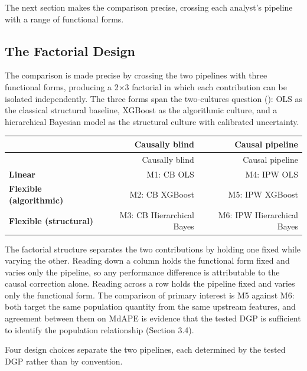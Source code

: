 The next section makes the comparison precise, crossing each analyst's pipeline with a range of functional forms.

\subsection{The Factorial Design}

The comparison is made precise by crossing the two pipelines with three functional forms, producing a 2$\times$3 factorial in which each contribution can be isolated independently. The three forms span the two-cultures question (): OLS as the classical structural baseline, XGBoost as the algorithmic culture, and a hierarchical Bayesian model as the structural culture with calibrated uncertainty.

{
\footnotesize
\setlength{\tabcolsep}{5pt}
\renewcommand{\arraystretch}{1.15}
\begin{longtable}{lrr}
\toprule
 & Causally blind & Causal pipeline \\
\midrule
\endfirsthead
\toprule
 & Causally blind & Causal pipeline \\
\midrule
\endhead
\bottomrule
\endlastfoot
\textbf{Linear} & M1: CB OLS & M4: IPW OLS \\
\textbf{Flexible (algorithmic)} & M2: CB XGBoost & M5: IPW XGBoost \\
\textbf{Flexible (structural)} & M3: CB Hierarchical Bayes & M6: IPW Hierarchical Bayes \\
\end{longtable}
}

The factorial structure separates the two contributions by holding one fixed while varying the other. Reading down a column holds the functional form fixed and varies only the pipeline, so any performance difference is attributable to the causal correction alone. Reading across a row holds the pipeline fixed and varies only the functional form. The comparison of primary interest is M5 against M6: both target the same population quantity from the same upstream features, and agreement between them on MdAPE is evidence that the tested DGP is sufficient to identify the population relationship (Section 3.4).

Four design choices separate the two pipelines, each determined by the tested DGP rather than by convention.

